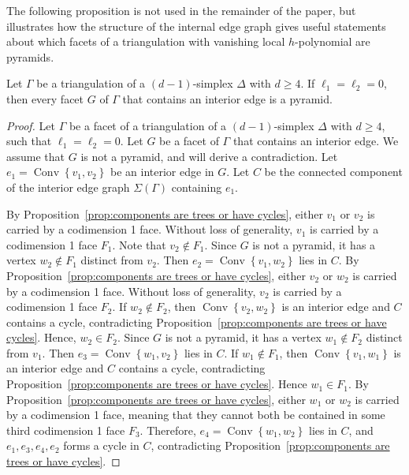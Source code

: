 \documentclass[ALCO,ThmDefs,Unicode,epreuves]{cedram}
\DeclareMathOperator{\Convop}{Conv}
\newcommand{\Conv}[1]{\Convop\left\{{#1}\right\}}
\begin{document}
The following proposition is not used in the remainder of the paper, but illustrates how 
the structure of the internal edge graph gives useful statements about which facets of a 
triangulation with vanishing local $h$-polynomial are pyramids.

\begin{prop} \label{prop:pyramid}
Let $\Gamma$ be a triangulation of a $(d - 1)$-simplex $\Delta$ with $d \ge 4$. If $\ell_1= \ell_2 = 0$,
then every facet $G$ of $\Gamma$ that contains an interior edge is a pyramid.
\end{prop}

\begin{proof}
Let $\Gamma$ be a facet of a triangulation of a $(d - 1)$-simplex $\Delta$ with $d \ge 4$, such that $\ell_1= \ell_2 = 0$. Let $G$ be a facet of $\Gamma$ that contains an interior edge. We assume that $G$ is not a pyramid, and will derive a contradiction. Let $e_1 = \Conv{v_1, v_2}$ be an interior edge in $G$. Let $C$ be the connected component of the interior edge graph $\Sigma(\Gamma)$ containing $e_1$. 

By Proposition~\ref{prop:components are trees or have cycles}, either $v_1$ or $v_2$ is carried by a codimension 1 face.
Without
loss of generality, $v_1$ is carried by a codimension 1 face $F_1$. Note that $v_2 \notin F_1$. Since $G$ is not a pyramid, it has a vertex $w_2 \notin F_1$ distinct from $v_2$. Then $e_2 = \Conv{v_1, w_2}$ lies in $C$.
By Proposition~\ref{prop:components are trees or have cycles}, either $v_2$ or $w_2$ is carried by a codimension 1 face. Without
loss of generality, $v_2$ is carried by a codimension 1 face $F_2$. If $w_2 \notin F_2$, then $\Conv{v_2, w_2}$
is an interior edge and $C$ contains a cycle, contradicting Proposition~\ref{prop:components are trees or have cycles}. 
Hence, $w_2 \in F_2$. Since $G$ is not a pyramid, it has a vertex $w_1 \notin F_2$ distinct from $v_1$.
Then $e_3 = \Conv{w_1, v_2}$ lies in $C$. If $w_1 \notin F_1$, then $\Conv{v_1, w_1}$
is an interior edge and $C$ contains a cycle, contradicting Proposition~\ref{prop:components are trees or have cycles}. 
Hence $w_1 \in F_1$. By Proposition~\ref{prop:components are trees or have cycles}, 
either $w_1$ or $w_2$ is carried by a codimension 1 face, meaning that they cannot both 
be contained in some third codimension 1 face $F_3$. Therefore, 
$e_4 = \Conv{w_1, w_2}$ lies in $C$, and $e_1,e_3,e_4,e_2$ forms a 
cycle in $C$, contradicting Proposition~\ref{prop:components are trees or have cycles}.
\end{proof}
\end{document}
